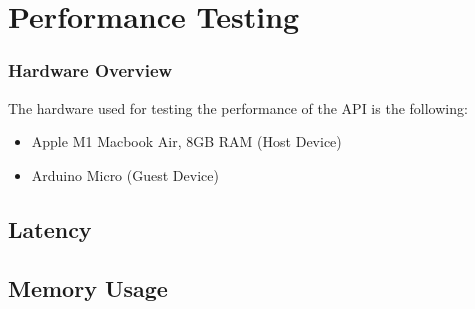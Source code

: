 \section{Performance Testing}

\subsubsection{Hardware Overview}
The hardware used for testing the performance of the API is the following:

\begin{itemize}
\item Apple M1 Macbook Air, 8GB RAM (Host Device)

\item Arduino Micro (Guest Device)
\end{itemize}


\subsection{Latency}

\subsection{Memory Usage}
 